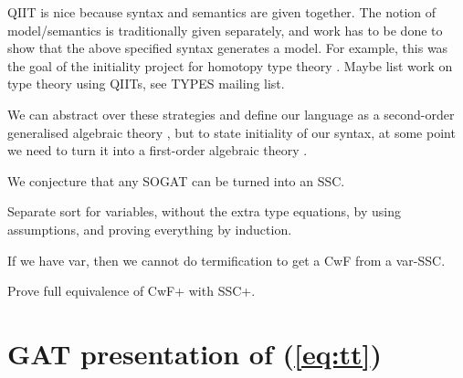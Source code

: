 \documentclass[sigplan,10pt,anonymous,review]{acmart}\settopmatter{printfolios=true,printccs=false,printacmref=false}
\begin{document}
QIIT is nice because syntax and semantics are given together. The
notion of model/semantics is traditionally given separately, and work
has to be done to show that the above specified syntax generates a
model. For example, this was the goal of the initiality project for
homotopy type theory \cite{initiality-agda}. Maybe list work on type theory
using QIITs, see TYPES mailing list.

We can abstract over these strategies and define our language as a
second-order generalised algebraic theory
\cite{DBLP:journals/corr/abs-1904-04097}, but to state initiality of
our syntax, at some point we need to turn it into a first-order
algebraic theory \cite{DBLP:conf/fscd/BocquetKS23}.

We conjecture that any SOGAT can be turned into an SSC.

Separate sort for variables, without the extra type equations, by
using assumptions, and proving everything by induction.

If we have var, then we cannot do termification to get a CwF from a var-SSC.

Prove full equivalence of CwF+ with SSC+.

{}


\pagebreak

\appendix

\section{GAT presentation of (\ref{eq:tt})}
\label{app:tt}
\end{document}
